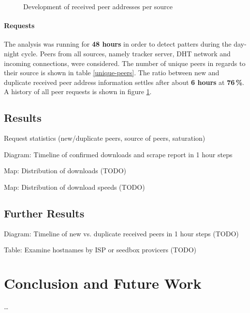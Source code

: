 \documentclass[10pt, a4paper]{scrartcl} %
\renewcommand{\_}{\origunderscore\allowbreak}
\begin{document}
\begin{figure}
\centering
\caption{Development of received peer addresses per source}
\label{request-history}
\end{figure}

\paragraph{Requests}
The analysis was running for \textbf{48 hours} in order to detect patters during the day-night cycle. Peers from all sources, namely tracker server, DHT network and incoming connections, were considered. The number of unique peers in regards to their source is shown in table \ref{unique-peers}. The ratio between new and duplicate received peer address information settles after about \textbf{6 hours} at \textbf{76\,\%}. A history of all peer requests is shown in figure \ref{request-history}.

\subsection{Results}
Request statistics (new/duplicate peers, source of peers, saturation)

Diagram: Timeline of confirmed downloads and scrape report in 1 hour steps

Map: Distribution of downloads (TODO)

Map: Distribution of download speeds (TODO)

\subsection{Further Results}
Diagram: Timeline of new vs. duplicate received peers in 1 hour steps (TODO)

Table: Examine hostnames by ISP or seedbox provicers (TODO)

\section{Conclusion and Future Work}
\dots
\newpage

\printbibliography[heading=bibintoc]
\end{document}
